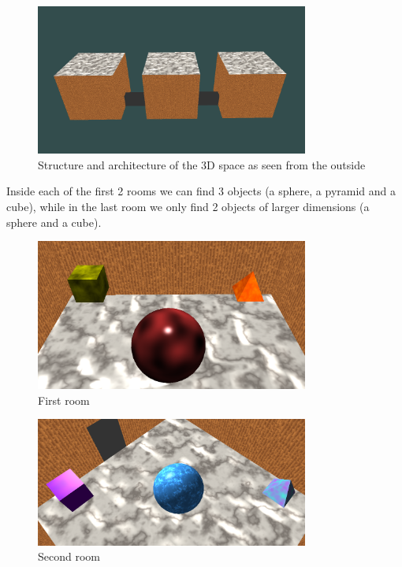 \documentclass[12pt]{article}
\begin{document}
\begin{figure}[H]
    \centering
    \includegraphics[width=0.8\textwidth]{Images/architecture.png}
    \caption{Structure and architecture of the 3D space as seen from the outside}
\end{figure}

Inside each of the first 2 rooms we can find 3 objects (a sphere, a pyramid and a cube), while in the last room we only find 2 objects of larger dimensions (a sphere and a cube). 

\begin{figure}[H]
    \centering
    \includegraphics[width=0.8\textwidth]{Images/firstRoom.png}
    \caption{First room}
\end{figure}

\begin{figure}[H]
    \centering
    \includegraphics[width=0.8\textwidth]{Images/secondRoom.png}
    \caption{Second room}
\end{figure}
\end{document}

